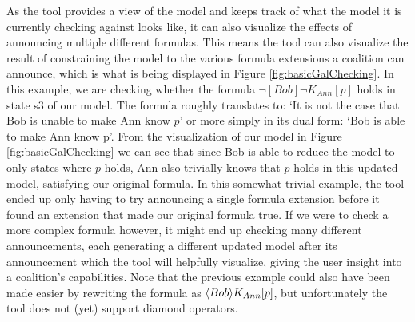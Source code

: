 As the tool provides a view of the model and keeps track of what the model it is currently checking against looks like, it can also visualize the effects of announcing multiple different formulas. This means the tool can also visualize the result of constraining the model to the various formula extensions a coalition can announce, which is what is being displayed in Figure \ref{fig:basicGalChecking}. In this example, we are checking whether the formula $\neg [Bob]\neg K_{Ann}[p]$ holds in state s3 of our model. The formula roughly translates to: `It is not the case that Bob is unable to make Ann know $p$' or more simply in its dual form: `Bob is able to make Ann know p'. From the visualization of our model in Figure \ref{fig:basicGalChecking} we can see that since Bob is able to reduce the model to only states where $p$ holds, Ann also trivially knows that $p$ holds in this updated model, satisfying our original formula. In this somewhat trivial example, the tool ended up only having to try announcing a single formula extension before it found an extension that made our original formula true. If we were to check a more complex formula however, it might end up checking many different announcements, each generating a different updated model after its announcement which the tool will helpfully visualize, giving the user insight into a coalition's capabilities. Note that the previous example could also have been made easier by rewriting the formula as $\langle Bob\rangle K_{Ann}[p]$, but unfortunately the tool does not (yet) support diamond operators. 



